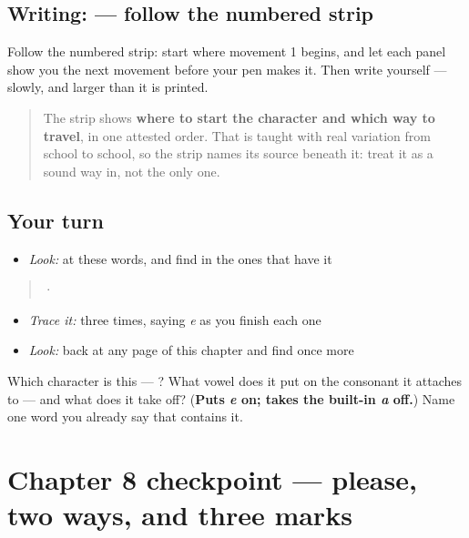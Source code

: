 \subsection*{Writing:  — follow the numbered strip}

Follow the numbered strip: start where movement 1 begins, and let each panel show you the next movement before your pen makes it. Then write  yourself — slowly, and larger than it is printed.

\begin{quote}
The strip shows \textbf{where to start the character and which way to travel}, in one attested order. That is taught with real variation from school to school, so the strip names its source beneath it: treat it as a sound way in, not the only one.
\end{quote}

\subsection*{Your turn}
\begin{itemize}
\raggedright
  \item \emph{Look:} at these words, and find  in the ones that have it
\end{itemize}

\begin{quote}
  ·  
\end{quote}

\begin{itemize}
\raggedright
  \item \emph{Trace it:}  three times, saying \emph{e} as you finish each one
  \item \emph{Look:} back at any page of this chapter and find  once more
\end{itemize}

\begin{tcolorbox}[breakable,colback=teal!4,colframe=teal!35!black,title={Before you move on}]
Which character is this — ? What vowel does it put on the consonant it attaches to — and what does it take off? (\textbf{Puts \emph{e} on; takes the built-in \emph{a} off.}) Name one word you already say that contains it.
\end{tcolorbox}
\section[Practice]{Chapter 8 checkpoint — please, two ways, and three marks}

